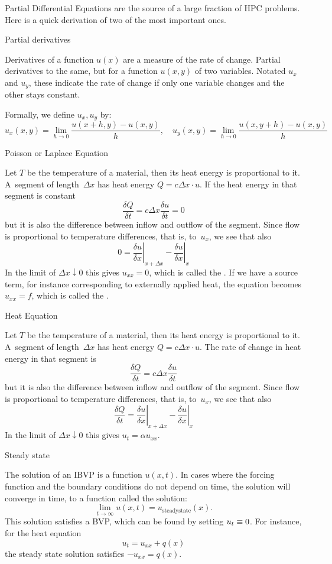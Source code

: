 
Partial Differential Equations
are the source of a large fraction of \ac{HPC} problems. Here is a
quick derivation of two of the most important ones.

 {Partial derivatives}

Derivatives of a function $u(x)$ are a measure of the rate of
change. Partial derivatives to the same, but for a function $u(x,y)$
of two variables. Notated $u_x$ and $u_y$, these  indicate the rate of change if only one variable changes
and the other stays constant.

Formally, we define
$u_x,u_y$ by:
\[ u_x(x,y) = \lim_{h\rightarrow0}\frac{u(x+h,y)-u(x,y)}h,\quad
   u_y(x,y) = \lim_{h\rightarrow0}\frac{u(x,y+h)-u(x,y)}h
\]

 {Poisson or Laplace Equation}

Let $T$ be the temperature of a material, then its heat energy is
proportional to it. A~segment of length~$\Delta x$ has heat energy
$Q=c\Delta x\cdot u$. If the heat energy in that
segment is constant
\[ \frac{\delta Q}{\delta t}=c\Delta x\frac{\delta u}{\delta t}=0 \]
but it is also the difference between inflow and outflow of the
segment. Since flow is proportional to temperature differences, that
is, to~$u_x$, we see that also
\[ 0=
    \left.\frac{\delta u}{\delta x}\right|_{x+\Delta x}-
    \left.\frac{\delta u}{\delta x}\right|_{x}
\]
In the limit of $\Delta x\downarrow0$ this gives $u_{xx}=0$, which is
called the . If we have a source term, for
instance corresponding to externally applied heat, the equation
becomes $u_{xx}=f$, which is called the .

 {Heat Equation}

Let $T$ be the temperature of a material, then its heat energy is
proportional to it. A~segment of length~$\Delta x$ has heat energy
$Q=c\Delta x\cdot u$. The rate of change in heat energy in that
segment is
\[ \frac{\delta Q}{\delta t}=c\Delta x\frac{\delta u}{\delta t} \]
but it is also the difference between inflow and outflow of the
segment. Since flow is proportional to temperature differences, that
is, to~$u_x$, we see that also
\[ \frac{\delta Q}{\delta t}=
    \left.\frac{\delta u}{\delta x}\right|_{x+\Delta x}-
    \left.\frac{\delta u}{\delta x}\right|_{x}
\]
In the limit of $\Delta x\downarrow0$ this gives $u_t=\alpha u_{xx}$.

 {Steady state}
\label{app:steadystate}

The solution of an \ac{IBVP} is a function $u(x,t)$. In cases where
the forcing function and the boundary conditions do not depend on
time, the solution will converge in time, to a function called the
 solution:
\[ \lim_{t\rightarrow\infty} u(x,t)=u_{\mathrm{steady state}}(x). \]
This solution satisfies a \ac{BVP}, which can be found by setting
$u_t\equiv\nobreak0$. For instance, for the heat equation \[
u_t=u_{xx}+q(x) \] the steady state solution satisfies $-u_{xx}=q(x)$.

